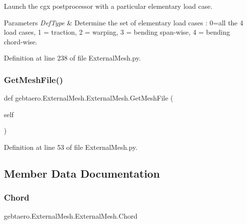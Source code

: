 Launch the cgx postprocessor with a particular elementary load case. 


\begin{DoxyParams}{Parameters}
{\em Def\+Type} & Determine the set of elementary load cases \+: 0=all the 4 load cases, 1 = traction, 2 = warping, 3 = bending span-\/wise, 4 = bending chord-\/wise. \\
\hline
\end{DoxyParams}


Definition at line 238 of file External\+Mesh.\+py.

\mbox{\label{classgebtaero_1_1_external_mesh_1_1_external_mesh_a9ac15ea158d9eeccf982355c551ae334}} 
\subsubsection{\texorpdfstring{Get\+Mesh\+File()}{GetMeshFile()}}
{\footnotesize\ttfamily def gebtaero.\+External\+Mesh.\+External\+Mesh.\+Get\+Mesh\+File (\begin{DoxyParamCaption}\item[{}]{self }\end{DoxyParamCaption})}



Definition at line 53 of file External\+Mesh.\+py.



\subsection{Member Data Documentation}
\mbox{\label{classgebtaero_1_1_external_mesh_1_1_external_mesh_ac9f8fc4f8dd8e81757bc8a5b2b5323d4}} 
\subsubsection{\texorpdfstring{Chord}{Chord}}
{\footnotesize\ttfamily gebtaero.\+External\+Mesh.\+External\+Mesh.\+Chord}



